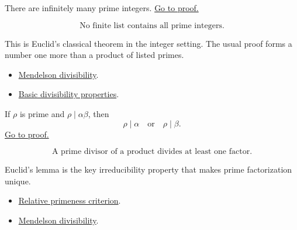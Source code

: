 \begin{theorem}
\label{thm:men-infinitude-of-primes}
There are infinitely many prime integers.
\hyperref[prf:men-infinitude-of-primes]{Go to proof.}
\end{theorem}

\begin{remark*}
\[
  \text{No finite list contains all prime integers.}
\]
\end{remark*}

\begin{remark*}[Interpretation]
This is Euclid's classical theorem in the integer setting. The usual proof
forms a number one more than a product of listed primes.
\end{remark*}

\begin{dependencies}
\begin{itemize}
  \item \hyperref[def:men-divisibility]{Mendelson divisibility}.
  \item \hyperref[thm:men-basic-divisibility-properties]{Basic divisibility properties}.
\end{itemize}
\end{dependencies}

\begin{theorem}
\label{thm:men-euclid-lemma}
If \(\rho\) is prime and \(\rho\mid\alpha\beta\), then
\[
  \rho\mid\alpha
  \quad\text{or}\quad
  \rho\mid\beta.
\]
\hyperref[prf:men-euclid-lemma]{Go to proof.}
\end{theorem}

\begin{remark*}
\[
  \text{A prime divisor of a product divides at least one factor.}
\]
\end{remark*}

\begin{remark*}[Interpretation]
Euclid's lemma is the key irreducibility property that makes prime
factorization unique.
\end{remark*}

\begin{dependencies}
\begin{itemize}
  \item \hyperref[thm:men-relative-primeness]{Relative primeness criterion}.
  \item \hyperref[def:men-divisibility]{Mendelson divisibility}.
\end{itemize}
\end{dependencies}

